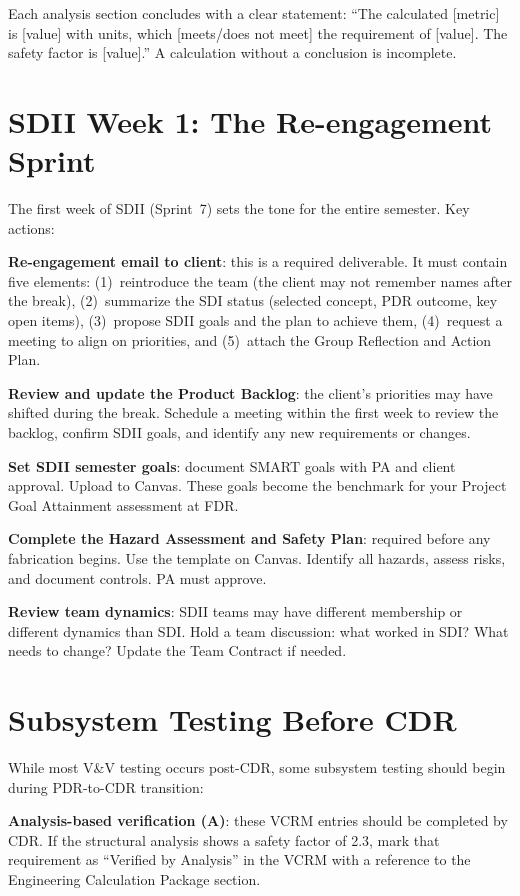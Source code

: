 Each analysis section concludes with a clear statement: ``The calculated [metric] is [value] with units, which [meets/does not meet] the requirement of [value]. The safety factor is [value].'' A calculation without a conclusion is incomplete.

\section{SDII Week 1: The Re-engagement Sprint}
The first week of SDII (Sprint~7) sets the tone for the entire semester. Key actions:

\textbf{Re-engagement email to client}: this is a required deliverable. It must contain five elements: (1)~reintroduce the team (the client may not remember names after the break), (2)~summarize the SDI status (selected concept, PDR outcome, key open items), (3)~propose SDII goals and the plan to achieve them, (4)~request a meeting to align on priorities, and (5)~attach the Group Reflection and Action Plan.

\textbf{Review and update the Product Backlog}: the client's priorities may have shifted during the break. Schedule a meeting within the first week to review the backlog, confirm SDII goals, and identify any new requirements or changes.

\textbf{Set SDII semester goals}: document SMART goals with PA and client approval. Upload to Canvas. These goals become the benchmark for your Project Goal Attainment assessment at FDR.

\textbf{Complete the Hazard Assessment and Safety Plan}: required before any fabrication begins. Use the template on Canvas. Identify all hazards, assess risks, and document controls. PA must approve.

\textbf{Review team dynamics}: SDII teams may have different membership or different dynamics than SDI. Hold a team discussion: what worked in SDI? What needs to change? Update the Team Contract if needed.



\section{Subsystem Testing Before CDR}
While most V\&V testing occurs post-CDR, some subsystem testing should begin during PDR-to-CDR transition:

\textbf{Analysis-based verification (A)}: these VCRM entries should be completed by CDR. If the structural analysis shows a safety factor of 2.3, mark that requirement as ``Verified by Analysis'' in the VCRM with a reference to the Engineering Calculation Package section.

